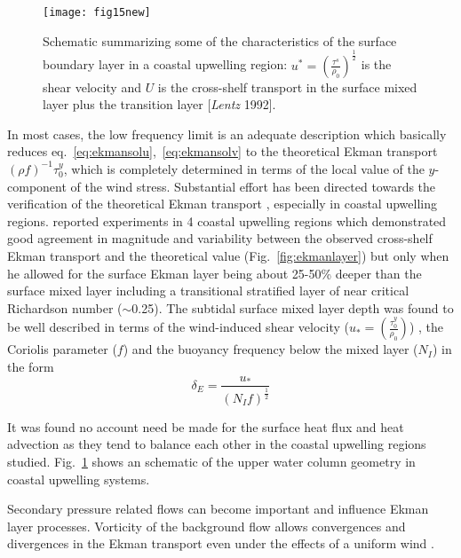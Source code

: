 \begin{figure}
  \centering
  \texttt{[image: fig15new]}
  \caption{Schematic summarizing some of the characteristics of
  the surface boundary layer in a coastal upwelling region:
  $u^*=(\frac{\tau^{s}}{\rho_0})^{\frac{1}{2}}$ is the shear
  velocity and $U$ is the cross-shelf transport in the surface
  mixed layer plus the transition layer [{\it Lentz} 1992].}
  \label{fig:upperlayerdiag}
\end{figure}
In most cases, the low frequency limit is an adequate description
which basically reduces eq.~\ref{eq:ekmansolu},~\ref{eq:ekmansolv}
to the theoretical Ekman transport $(\rho f)^{-1}\tau_{0}^{y}$,
which is completely determined in terms of the local value of the
$y$-component of the wind stress. Substantial effort has been
directed towards the verification of the theoretical Ekman
transport \citep{Smith81,Brink83}, especially in coastal upwelling
regions. \citet{Lentz92} reported experiments in 4 coastal
upwelling regions which demonstrated good agreement in magnitude
and variability between the observed cross-shelf Ekman transport
and the theoretical value (Fig.~\ref{fig:ekmanlayer}) but only
when he allowed for the surface Ekman layer being about 25-50\%
deeper than the surface mixed layer including a transitional
stratified layer of near critical Richardson number ($\sim$0.25).
The subtidal surface mixed layer depth was found to be well
described in terms of the wind-induced shear velocity
($u_*=(\frac{\tau_0^y}{\rho_0})$) , the Coriolis parameter ($f$)
and the buoyancy frequency below the mixed layer ($N_I$) in the
form
\begin{equation}\label{eq:ekmandepth}
  \delta _E=\frac{u_*}{(N_If)^{\frac{1}{2}}}
\end{equation}

It was found no account need be made for the surface heat flux and
heat advection as they tend to balance each other in the coastal
upwelling regions studied. Fig.~\ref{fig:upperlayerdiag} shows an
schematic of the upper water column geometry in coastal upwelling
systems.

Secondary pressure related flows can become important and
influence Ekman layer processes. Vorticity of the background flow
allows convergences and divergences in the Ekman transport even
under the effects of a uniform wind \citep{Niiler69}.
